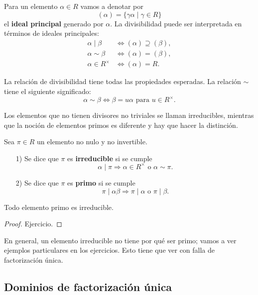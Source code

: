 Para un elemento $\alpha \in R$ vamos a denotar por
$$(\alpha) = \{ \gamma\alpha \mid \gamma \in R \}$$
el \textbf{ideal principal} generado por $\alpha$. La divisibilidad
puede ser interpretada en términos de ideales principales:
\begin{align*}
  \alpha \mid \beta & \iff (\alpha) \supseteq (\beta),\\
  \alpha \sim \beta & \iff (\alpha) = (\beta),\\
  \alpha \in R^\times & \iff (\alpha) = R.
\end{align*}

La relación de divisibilidad tiene todas las propiedades esperadas. La relación
$\sim$ tiene el siguiente significado:
$$\alpha\sim\beta \iff \beta = u\alpha\text{ para }u\in R^\times.$$

Los elementos que no tienen divisores no triviales se llaman irreducibles,
mientras que la noción de elementos primos es diferente y hay que hacer
la distinción.

\begin{definicion}
  Sea $\pi\in R$ un elemento no nulo y no invertible.

  \begin{enumerate}
  \item[1)] Se dice que $\pi$ es \textbf{irreducible} si se cumple
    $$\alpha\mid \pi \Longrightarrow \alpha\in R^\times\text{ o }\alpha\sim \pi.$$

  \item[2)] Se dice que $\pi$ es \textbf{primo} si se cumple
    \[ \pi \mid \alpha\beta \Longrightarrow
           \pi \mid \alpha\text{ o }\pi \mid \beta. \]
  \end{enumerate}
\end{definicion}

\begin{proposicion}
  Todo elemento primo es irreducible.

  \begin{proof}
    Ejercicio.
  \end{proof}
\end{proposicion}

En general, un elemento irreducible no tiene por qué ser primo; vamos a ver
ejemplos particulares en los ejercicios. Esto tiene que ver con falla
de factorización única.

\subsection{Dominios de factorización única}

